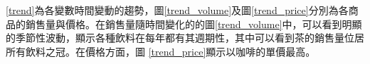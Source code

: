 \vspace{-3em}
\begin{singlespace}
        \begin{footnotesize}
        		 \ref{trend}為各變數時間變動的趨勢，圖\ref{trend_volume}及圖\ref{trend_price}分別為各商品的銷售量與價格。在銷售量隨時間變化的的圖\ref{trend_volume}中，可以看到明顯的季節性波動，顯示各種飲料在每年都有其週期性，其中可以看到茶的銷售量位居所有飲料之冠。在價格方面，圖 \ref{trend_price}顯示以咖啡的單價最高。
        \end{footnotesize}
\end{singlespace}






